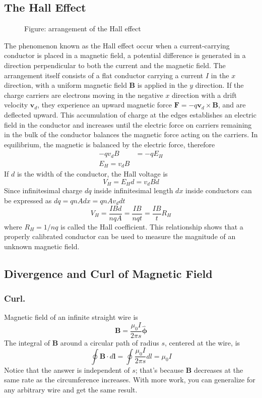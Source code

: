 \documentclass[../../../main.tex]{subfiles}
\begin{document}
\subsection{The Hall Effect}
\begin{figure}[t]
    \centering
    \caption*{Figure: arrangement of the Hall effect}
\end{figure}
The phenomenon known as the Hall effect occur when a current-carrying conductor is placed in a magnetic field, a potential difference is generated in a direction perpendicular to both the current and the magnetic field. The arrangement itself consists of a flat conductor carrying a current $I$ in the $x$ direction, with a uniform magnetic field \textbf{B} is applied in the $y$ direction. If the charge carriers are electrons moving in the negative $x$ direction with a drift velocity $\mathbf{v}_d$, they experience an upward magnetic force $\mathbf{F}=-q\mathbf{v}_d\times\mathbf{B}$, and are deflected upward. This accumulation of charge at the edges establishes an electric field in the conductor and increases until the electric force on carriers remaining in the bulk of the conductor balances the magnetic force acting on the carriers. In equilibrium, the magnetic is balanced by the electric force, therefore
\begin{align*}
    -qv_dB & =-qE_H \\
    E_H=v_dB
\end{align*}
If $d$ is the width of the conductor, the Hall voltage is
\begin{equation*}
    V_H=E_Hd=v_dBd
\end{equation*}
Since infinitesimal charge $dq$ inside infinitesimal length $dx$ inside conductors can be expressed as $dq=qnAdx=qnAv_ddt$
\begin{equation*}
    V_H=\frac{IBd}{nqA}=\frac{IB}{nqt}=\frac{IB}{t}R_H
\end{equation*}
where $R_H=1/nq$ is called the Hall coefficient. This relationship shows that a properly calibrated conductor can be used to measure the magnitude of an unknown magnetic field.

\subsection{Divergence and Curl of Magnetic Field}
\subsubsection{Curl.} Magnetic field of an infinite straight wire is
\begin{equation*}
    \mathbf{B}=\frac{\mu_0I}{2\pi s}\boldsymbol{\hat{\phi}}
\end{equation*}
The integral of \textbf{B} around a circular path of radius $s$, centered at the wire, is
\begin{equation*}
    \oint \mathbf{B}\cdot d\mathbf{l}=\oint\frac{\mu_0I}{2\pi s}dl=\mu_0I
\end{equation*}
Notice that the answer is independent of $s$; that's because \textbf{B} decreases at the same rate as the circumference increases. With more work, you can generalize for any arbitrary wire and get the same result.
\end{document}
